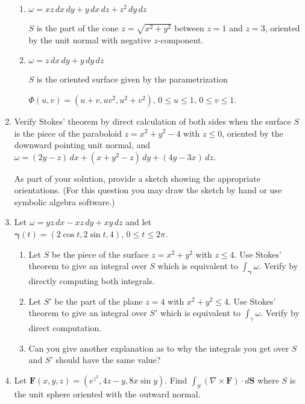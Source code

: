 \documentclass{article}
\begin{document}
\begin{enumerate}
\begin{enumerate}
        \item $\omega  = xz \, dx \, dy + y \, dx \, dz + z^2 \, dy \, dz$

        $S$ is the part of the cone $z = \sqrt{x^2 + y^2}$ between $z=1$ and $z=3$,  oriented by the unit normal with negative $z$-component.

        \item $\omega = z \, dx \, dy + y \, dy \, dz$
        
        $S$ is the oriented surface given by the parametrization

        $\Phi (u,v) = (u+v, uv^2, u^2 + v^2),\, 0 \leq u \leq 1,\, 0\leq v \leq 1$.
    \end{enumerate}

    \newpage
    \item Verify Stokes' theorem by direct calculation of both sides when the surface $S$ is the piece of the paraboloid $z= x^2 + y^2 - 4$ with $z \leq 0$, oriented by the downward pointing unit normal, and $\omega = (2y-z)\, dx + (x + y^2 - z)\, dy + (4y-3x)\, dz$.

    As part of your solution, provide a sketch showing the appropriate orientations. (For this question you may draw the sketch by hand or use symbolic algebra software.)
    \newpage
    \item Let $\omega = yz\, dx - xz \, dy + xy \, dz$ and let $\boldsymbol \gamma(t) = (2\cos t, 2\sin t, 4),\, 0 \leq t \leq 2\pi$.
    \begin{enumerate}
        \item Let $S$ be the piece of the surface $z = x^2 + y^2$ with $z \leq 4$. Use Stokes' theorem to give an integral over $S$ which is equivalent to $\displaystyle \int_{\boldsymbol \gamma} \omega$. Verify by directly computing both integrals.
        \item Let $S'$ be the part of the plane $z=4$ with $x^2 + y^2 \leq 4$. Use Stokes' theorem to give an integral over $S'$ which is equivalent to $\displaystyle \int_{\gamma} \omega$. Verify by direct computation.
        
        \item Can you give another explanation as to why the integrals you get over $S$ and $S'$ should have the same value?

    \end{enumerate}
    
    \newpage
    \item Let $\boldsymbol F (x,y,z) = (e^{z^2}, 4z-y, 8x \sin y)$. Find $\displaystyle \int_S (\nabla \times \boldsymbol F)\cdot d\boldsymbol S$ where $S$ is the unit sphere oriented with the outward normal.


\end{enumerate}
\end{document}

